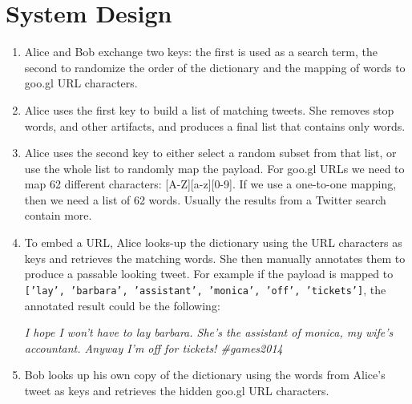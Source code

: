 \documentclass[]{article}
\begin{document}
\section{System Design}


 \begin{enumerate}
 	\item Alice and Bob exchange two keys: the first is used as a search term, the second to randomize the order of the dictionary and the mapping of words to goo.gl URL characters. 
 	\item Alice uses the first key to build a list of matching tweets. She removes stop words,  and other artifacts, and produces a final list that contains only words.
 	\item Alice uses the second key to either select a random subset from that list, or use the whole list to randomly map the payload. For goo.gl URLs we need to map 62 different characters: [A-Z][a-z][0-9]. If we use a one-to-one mapping, then we need a list of 62 words. Usually the results from a Twitter search contain more. 
 	\item To embed a URL, Alice looks-up the dictionary using the URL characters as keys and retrieves the matching words. She then manually annotates them to produce a passable looking tweet. For example if the payload is mapped to \texttt{['lay', 'barbara', 'assistant', 'monica', 'off', 'tickets']}, the annotated result could be the following:
 	
 	\textit{I hope I won’t have to lay barbara. She’s the assistant of monica, my wife’s accountant. Anyway I’m off for tickets! \#games2014}
 	\item Bob looks up his own copy of the dictionary using the words from Alice's tweet as keys and retrieves the hidden goo.gl URL characters.
 
 \end{enumerate}
\end{document}
